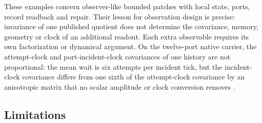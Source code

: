 \documentclass[11pt]{article}
\theoremstyle{definition}
\theoremstyle{remark}
\numberwithin{equation}{section}
\begin{document}
These examples concern observer-like bounded patches with local state,
ports, record readback and repair. Their lesson for observation design is
precise: invariance of one published quotient does not determine the
covariance, memory, geometry or clock of an additional readout. Each extra
observable requires its own factorization or dynamical argument. On the
twelve-port native carrier, the attempt-clock and port-incident-clock
covariances of one history are not proportional: the mean wait is six
attempts per incident tick, but the incident-clock covariance differs from
one sixth of the attempt-clock covariance by an anisotropic matrix that no
scalar amplitude or clock conversion removes \citep{ophcontinuum}.

\subsection{Limitations}
\end{document}
